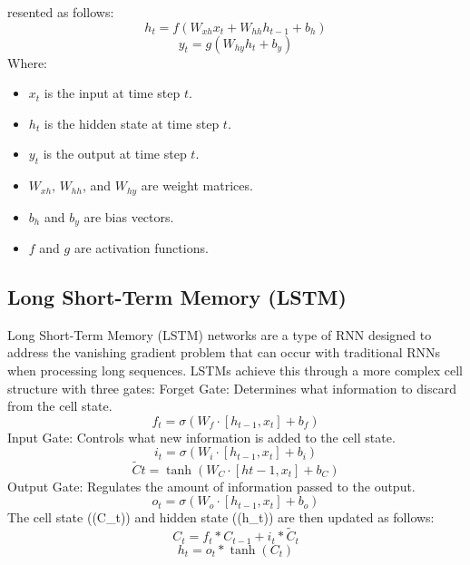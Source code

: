 \documentclass{ieeeojies}
\begin{document}
resented as follows:
\begin{dmath*}
    h_t = f(W_{xh} x_t + W_{hh} h_{t-1} + b_h)
\end{dmath*}
\begin{dmath*}
    y_t = g(W_{hy} h_t + b_y)
\end{dmath*}
Where:\begin {itemize}
\item \(x_t\) is the input at time step \(t\).
\item \(h_t\) is the hidden state at time step \(t\).
\item \(y_t\) is the output at time step \(t\).
\item \(W_{xh}\), \(W_{hh}\), and \(W_{hy}\) are weight matrices.
\item \(b_h\) and \(b_y\) are bias vectors.
\item \(f\) and \(g\) are activation functions.
\end{itemize}

\subsection{Long Short-Term Memory (LSTM)}
Long Short-Term Memory (LSTM) networks are a type of RNN designed to address the vanishing gradient problem that can occur with traditional RNNs when processing long sequences. LSTMs achieve this through a more complex cell structure with three gates:
Forget Gate: Determines what information to discard from the cell state.
\begin{dmath*}
    f_t = \sigma(W_f \cdot [h_{t-1}, x_t] + b_f)
\end{dmath*}
Input Gate: Controls what new information is added to the cell state.
\begin{dmath*}
    i_t = \sigma(W_i \cdot [h_{t-1}, x_t] + b_i)
\end{dmath*}
\begin{dmath*}
    \tilde{C}t = \tanh(W_C \cdot [h{t-1}, x_t] + b_C)
\end{dmath*}
Output Gate: Regulates the amount of information passed to the output.
\begin{dmath*}
    o_t = \sigma(W_o \cdot [h_{t-1}, x_t] + b_o)
\end{dmath*}
The cell state ((C_t)) and hidden state ((h_t)) are then updated as follows:
\begin{dmath*}
    C_t = f_t * C_{t-1} + i_t * \tilde{C}_t
\end{dmath*}
\begin{dmath*}
    h_t = o_t * \tanh(C_t)
\end{dmath*}
\end{document}
